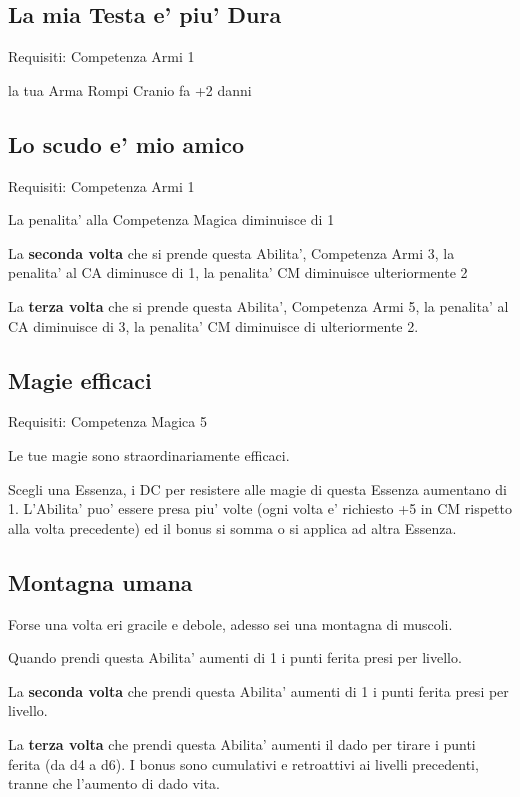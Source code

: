 \documentclass[a4paper,11pt,twoside,openany]{dndbook}
\begin{document}
\subsection{La mia Testa e' piu' Dura}

Requisiti: Competenza Armi 1

la tua Arma Rompi Cranio fa +2 danni

\subsection{Lo scudo e' mio amico}

Requisiti: Competenza Armi 1

La penalita' alla Competenza Magica diminuisce di 1

La \textbf{seconda volta} che si prende questa Abilita', Competenza Armi 3, la penalita' al CA diminusce di 1, la penalita' CM diminuisce ulteriormente 2

La \textbf{terza volta} che si prende questa Abilita', Competenza Armi 5, la penalita' al CA diminuisce di 3, la penalita' CM diminuisce di ulteriormente 2.

\subsection{Magie efficaci}

Requisiti: Competenza Magica 5

Le tue magie sono straordinariamente efficaci.

Scegli una Essenza, i DC per resistere alle magie di questa Essenza aumentano di 1. L'Abilita' puo' essere presa piu' volte (ogni volta e' richiesto +5 in CM rispetto alla volta precedente) ed il bonus si somma o si applica ad altra Essenza.

\subsection{Montagna umana}

Forse una volta eri gracile e debole, adesso sei una montagna di muscoli.

Quando prendi questa Abilita' aumenti di 1 i punti ferita presi per livello.

La \textbf{seconda volta} che prendi questa Abilita' aumenti di 1 i punti ferita presi per livello. 

La \textbf{terza volta} che prendi questa Abilita' aumenti il dado per tirare i punti ferita (da d4 a d6).
I bonus sono cumulativi e retroattivi ai livelli precedenti, tranne che l’aumento di dado vita.
\end{document}
